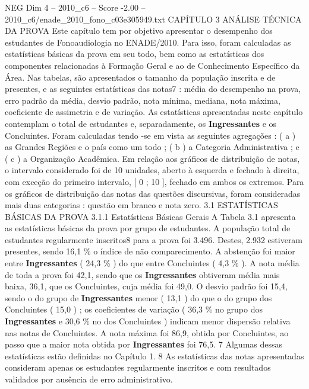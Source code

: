 \begin{textsample}{NEG Dim 4 – 2010\_c6 – Score -2.00 – 2010\_c6/enade\_2010\_fono\_c03e305949.txt}  \label{ex:f4_neg_050}
CAPÍTULO 3 ANÁLISE TÉCNICA DA PROVA Este capítulo tem por objetivo apresentar o desempenho dos estudantes de Fonoaudiologia no ENADE/2010.
Para isso, foram calculadas as estatísticas básicas da prova em seu todo, bem como as estatísticas dos componentes relacionadas à Formação Geral e ao de Conhecimento Específico da Área.
Nas tabelas, são apresentados o tamanho da população inscrita e de presentes, e as seguintes estatísticas das notas7 : média do desempenho na prova, erro padrão da média, desvio padrão, nota mínima, mediana, nota máxima, coeficiente de assimetria e de variação.
As estatísticas apresentadas neste capítulo contemplam o total de estudantes e, separadamente, os \textbf{Ingressantes} e os Concluintes.
Foram calculadas tendo -se em vista as seguintes agregações : ( a ) as Grandes Regiões e o país como um todo ; ( b ) a Categoria Administrativa ; e ( c ) a Organização Acadêmica.
Em relação aos gráficos de distribuição de notas, o intervalo considerado foi de 10 unidades, aberto à esquerda e fechado à direita, com exceção do primeiro intervalo, [ 0 ; 10 ], fechado em ambos os extremos.
Para os gráficos de distribuição das notas das questões discursivas, foram consideradas mais duas categorias : questão em branco e nota zero. 3.1 ESTATÍSTICAS BÁSICAS DA PROVA 3.1.1 Estatísticas Básicas Gerais A Tabela 3.1 apresenta as estatísticas básicas da prova por grupo de estudantes.
A população total de estudantes regularmente inscritos8 para a prova foi 3.496.
Destes, 2.932 estiveram presentes, sendo 16,1 \% o índice de não comparecimento.
A abstenção foi maior entre \textbf{Ingressantes} ( 24,3 \% ) do que entre Concluintes ( 4,3 \% ).
A nota média de toda a prova foi 42,1, sendo que os \textbf{Ingressantes} obtiveram média mais baixa, 36,1, que os Concluintes, cuja média foi 49,0.
O desvio padrão foi 15,4, sendo o do grupo de \textbf{Ingressantes} menor ( 13,1 ) do que o do grupo dos Concluintes ( 15,0 ) ; os coeficientes de variação ( 36,3 \% no grupo dos \textbf{Ingressantes} e 30,6 \% no dos Concluintes ) indicam menor dispersão relativa nas notas de Concluintes.
A nota máxima foi 86,9, obtida por Concluintes, ao passo que a maior nota obtida por \textbf{Ingressantes} foi 76,5. 7 Algumas dessas estatísticas estão definidas no Capítulo 1. 8 As estatísticas das notas apresentadas consideram apenas os estudantes regularmente inscritos e com resultados validados por ausência de erro administrativo.

\end{textsample}

